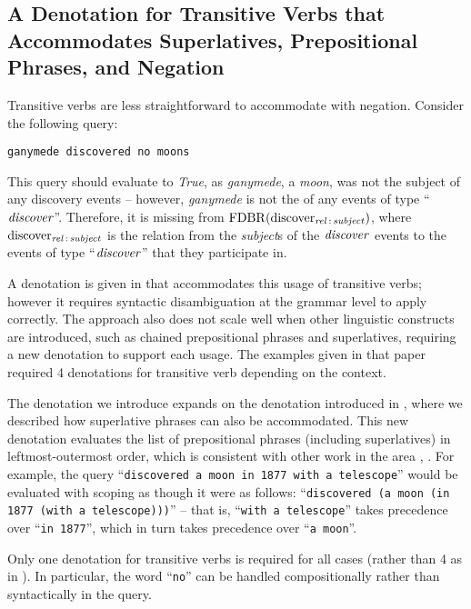 \documentclass[../main.tex]{subfiles}
\begin{document}
\begin{refsection}
\subsection{A Denotation for Transitive Verbs that Accommodates Superlatives, Prepositional Phrases, and Negation}
\label{webist2020conf:tvs}

Transitive verbs are less straightforward to accommodate with negation.  Consider the following query:
\begin{center}
    \texttt{ganymede discovered no moons}
\end{center}
\noindent This query should evaluate to \textit{True}, as \textit{ganymede}, a \textit{moon}, was not the subject of any discovery events -- however, \textit{ganymede} is not the  of any events of type ``$\operatorname{\mathit{discover}}$''.  Therefore, it is missing from $\operatorname{FDBR}({\operatorname{discover}_{\operatorname{\mathit{rel}}\,:\,\operatorname{\mathit{subject}}}})$, where $\operatorname{discover}_{\operatorname{\mathit{rel}}\,:\,\operatorname{\mathit{subject}}}$ is the relation from the \textit{subject}s of the $\operatorname{\mathit{discover}}$ events to the events of type ``$\operatorname{\mathit{discover}}$'' that they participate in.

A denotation is given in \cite{frostboulos2002} that accommodates this usage of transitive verbs; however it requires syntactic disambiguation at the grammar level to apply correctly.  The approach also does not scale well when other linguistic constructs are introduced, such as chained prepositional phrases and superlatives, requiring a new denotation to support each usage.  The examples given in that paper required 4 denotations for transitive verb depending on the context.

The denotation we introduce expands on the denotation introduced in \cite{frostpeelar2019}, where we described how superlative phrases can also be accommodated.  This new denotation evaluates the list of prepositional phrases (including superlatives) in leftmost-outermost order, which is consistent with other work in the area \cite{champollion2010quantification}, \cite{ferre2014squall}.  For example, the query ``\texttt{discovered a moon in 1877 with a telescope}'' would be evaluated with scoping as though it were as follows:
``\texttt{discovered (a moon (in 1877 (with a telescope)))}'' -- that is, ``\texttt{with a telescope}'' takes precedence over ``\texttt{in 1877}'', which in turn takes precedence over ``\texttt{a moon}''.

Only one denotation for transitive verbs is required for all cases (rather than 4 as in \cite{frostboulos2002}). In particular, the word ``\texttt{no}'' can be handled compositionally rather than syntactically in the query.


\end{refsection}
\end{document}
